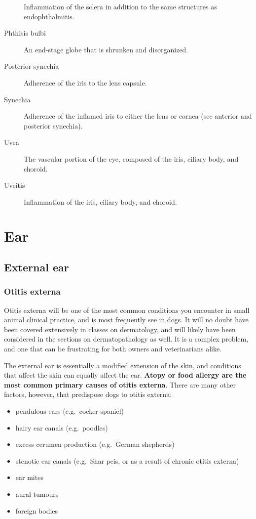 \documentclass[openany]{book}
\providecommand{\tightlist}{%
  \setlength{\itemsep}{0pt}\setlength{\parskip}{0pt}}
\begin{document}
\begin{description}
Inflammation of the sclera in addition to the same structures as
endophthalmitis.
\item[Phthisis bulbi]
An end-stage globe that is shrunken and disorganized.
\item[Posterior synechia]
Adherence of the iris to the lens capsule.
\item[Synechia]
Adherence of the inflamed iris to either the lens or cornea (see
anterior and posterior synechia).
\item[Uvea]
The vascular portion of the eye, composed of the iris, ciliary body, and
choroid.
\item[Uveitis]
Inflammation of the iris, ciliary body, and choroid.
\end{description}

\chapter{Ear}\label{ear}

\section{External ear}\label{external-ear}

\hypertarget{otitis-externa}{\subsection{Otitis
externa}\label{otitis-externa}}

Otitis externa will be one of the most common conditions you encounter
in small animal clinical practice, and is most frequently see in dogs.
It will no doubt have been covered extensively in classes on
dermatology, and will likely have been considered in the sections on
dermatopathology as well. It is a complex problem, and one that can be
frustrating for both owners and veterinarians alike.

The external ear is essentially a modified extension of the skin, and
conditions that affect the skin can equally affect the ear.
\textbf{Atopy or food allergy are the most common primary causes of
otitis externa}. There are many other factors, however, that predispose
dogs to otitis externa:

\begin{itemize}
\tightlist
\item
  pendulous ears (e.g.~cocker spaniel)
\item
  hairy ear canals (e.g.~poodles)
\item
  excess cerumen production (e.g.~German shepherds)
\item
  stenotic ear canals (e.g.~Shar peis, or as a result of chronic otitis
  externa)
\item
  ear mites
\item
  aural tumours
\item
  foreign bodies
\end{itemize}
\end{document}
